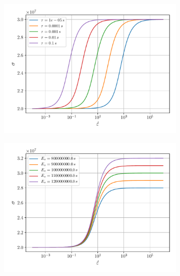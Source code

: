 \documentclass[12pt]{article}
\begin{document}
\begin{figure}
	\begin{subfigure}{0.48\textwidth}
		\centering 
		\includegraphics[width=\linewidth]{e-dot-stress-tau} 
	\end{subfigure}
	\begin{subfigure}{0.48\textwidth}
		\centering 
		\includegraphics[width=\linewidth]{e-dot-stress-E} 
	\end{subfigure}

\end{figure}
\end{document}
